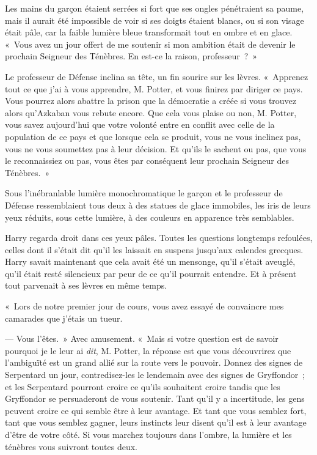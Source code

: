 Les mains du garçon étaient serrées si fort que ses ongles pénétraient sa paume, mais il aurait été impossible de voir si ses doigts étaient blancs, ou si son visage était pâle, car la faible lumière bleue transformait tout en ombre et en glace.
«~Vous avez un jour offert de me soutenir si mon ambition était de devenir le prochain Seigneur des Ténèbres.
En est-ce la raison, professeur~?~»

Le professeur de Défense inclina sa tête, un fin sourire sur les lèvres.
«~Apprenez tout ce que j'ai à vous apprendre, M. Potter, et vous finirez par diriger ce pays.
Vous pourrez alors abattre la prison que la démocratie a créée si vous trouvez alors qu'Azkaban vous rebute encore.
Que cela vous plaise ou non, M. Potter, vous savez aujourd'hui que votre volonté entre en conflit avec celle de la population de ce pays et que lorsque cela se produit, vous ne vous inclinez pas, vous ne vous soumettez pas à leur décision.
Et qu'ils le sachent ou pas, que vous le reconnaissiez ou pas, vous êtes par conséquent leur prochain Seigneur des Ténèbres.~»

Sous l'inébranlable lumière monochromatique le garçon et le professeur de Défense ressemblaient tous deux à des statues de glace immobiles, les iris de leurs yeux réduits, sous cette lumière, à des couleurs en apparence très semblables.

Harry regarda droit dans ces yeux pâles.
Toutes les questions longtemps refoulées, celles dont il s'était dit qu'il les laissait en suspens jusqu'aux calendes grecques.
Harry savait maintenant que cela avait été un mensonge, qu'il s'était aveuglé, qu'il était resté silencieux par peur de ce qu'il pourrait entendre.
Et à présent tout parvenait à ses lèvres en même temps.

«~Lors de notre premier jour de cours, vous avez essayé de convaincre mes camarades que j'étais un tueur.

--- Vous l'êtes.~»
Avec amusement.
«~Mais si votre question est de savoir pourquoi je le leur ai \emph{dit}, M. Potter, la réponse est que vous découvrirez que l'ambiguïté est un grand allié sur la route vers le pouvoir.
Donnez des signes de Serpentard un jour, contredisez-les le lendemain avec des signes de Gryffondor~; et les Serpentard pourront croire ce qu'ils souhaitent croire tandis que les Gryffondor se persuaderont de vous soutenir.
Tant qu'il y a incertitude, les gens peuvent croire ce qui semble être à leur avantage.
Et tant que vous semblez fort, tant que vous semblez gagner, leurs instincts leur disent qu'il est à leur avantage d'être de votre côté.
Si vous marchez toujours dans l'ombre, la lumière et les ténèbres vous suivront toutes deux.

